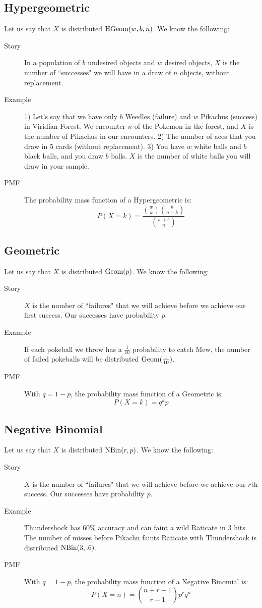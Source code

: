 \documentclass[11pt]{article}
\begin{document}
\begin{notes}
\subsection*{Hypergeometric}
Let us say that $X$ is distributed $\textrm{HGeom}(w, b, n)$. We know the following:
\begin{description}
	\item[Story] In a population of $b$ undesired objects and $w$ desired objects, $X$ is the number of ``successes" we will have in a draw of $n$ objects, without replacement.
	\item[Example] 1) Let's say that we have only $b$ Weedles (failure) and $w$ Pikachus (success) in Viridian Forest. We encounter $n$ of the Pokemon in the forest, and $X$ is the number of Pikachus in our encounters. 2) The number of aces that you draw in 5 cards (without replacement). 3) You have $w$ white balls and $b$ black balls, and you draw $b$ balls. $X$ is the number of white balls you will draw in your sample. 
	\item[PMF] The probability mass function of a Hypergeometric is:
\[P(X = k) = \frac{{w \choose k}{b \choose n-k}}{{w + b \choose n}}\]
\end{description}

\subsection*{Geometric} Let us say that $X$ is distributed $\textrm{Geom}(p)$. We know the following:
\begin{description}
	\item[Story] $X$ is the number of ``failures" that we will achieve before we achieve our first success. Our successes have probability $p$.
	\item[Example] If each pokeball we throw has a $\frac{1}{10}$ probability to catch Mew, the number of failed pokeballs will be distributed $\textrm{Geom}(\frac{1}{10})$.
	\item[PMF] With $q = 1-p$, the probability mass function of a Geometric is:
\[P(X = k) = q^kp\]
\end{description}

\subsection*{Negative Binomial} Let us say that $X$ is distributed $\textrm{NBin}(r, p)$. We know the following:
\begin{description}
	\item[Story] $X$ is the number of ``failures" that we will achieve before we achieve our $r$th success. Our successes have probability $p$.
	\item[Example] Thundershock has 60\% accuracy and can faint a wild Raticate in 3 hits. The number of misses before Pikachu faints Raticate with Thundershock is distributed $\textrm{NBin}(3, .6)$.
	\item[PMF] With $q = 1-p$, the probability mass function of a Negative Binomial is:
\[P(X = n) = {n+r - 1 \choose r -1}p^rq^n\]
\end{description}


\end{notes}
\end{document}
